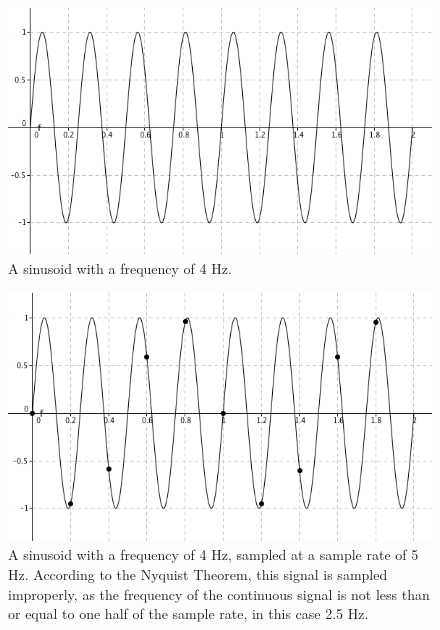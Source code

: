 \documentclass[12pt]{report}
\begin{document}
\begin{figure}[b!]

  \centering

  \includegraphics[scale=0.5]{img/orig}

  \caption{A sinusoid with a frequency of 4 Hz.}

  \label{fig:orig}

\end{figure}

\begin{figure}

  \centering

  \includegraphics[scale=0.5]{img/sampled}

  \caption{A sinusoid with a frequency of 4 Hz, sampled at a sample rate of 5 Hz. According to the Nyquist Theorem, this signal is sampled improperly, as the frequency of the continuous signal is not less than or equal to one half of the sample rate, in this case 2.5 Hz. }

  \label{fig:sampled}

\end{figure}
\end{document}
